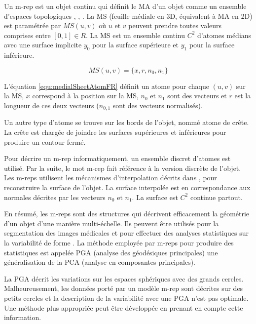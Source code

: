Un m-rep est un objet continu qui définit le MA d'un objet comme un ensemble d'espaces topologiques \cite{pizer1999segmentation}, \cite{yushkevich2003continuous}, \cite{pizer2003deformable}.
La MS (feuille médiale en 3D, équivalent à MA en 2D) est paramétrée par $MS (u, v)$ où $u$ et $v$ peuvent prendre toutes valeurs comprises entre $[0, 1] \in R$.
La MS est un ensemble continu $C^2$ d'atomes médians avec une surface implicite $y_{0}$ pour la surface supérieure et $y_{1}$ pour la surface inférieure.

\begin{equation}
MS (u, v) = \{x, r, n_0, n_1\}
\label{equ:medialSheetAtomFR}
\end{equation}

L'équation \ref{equ:medialSheetAtomFR} définit un atome pour chaque $(u, v)$ sur la MS,
$x$ correspond à la position sur la MS, $n_0$ et $n_1$ sont des vecteurs et $r$ est la longueur de ces deux vecteurs ($n_{0, 1}$ sont des vecteurs normalisés).


Un autre type d'atome se trouve sur les bords de l'objet, nommé atome de crête.
La crête est chargée de joindre les surfaces supérieures et inférieures pour produire un contour fermé.

Pour décrire un m-rep informatiquement, un ensemble discret d'atomes est utilisé.
Par la suite, le mot m-rep fait référence à la version discrète de l'objet.
Les m-reps utilisent les mécanismes d'interpolation décrits dans \cite{thall2004deformable}, pour reconstruire la surface de l'objet.
La surface interpolée est en correspondance aux normales décrites par les vecteurs $n_0$ et $n_1$.
La surface est $C^2$ continue partout.

En résumé, les m-reps sont des structures qui décrivent efficacement la géométrie d'un objet d'une manière multi-échelle.
Ils peuvent être utilisés pour la segmentation des images médicales \cite{pizer2005method} et pour effectuer des analyses statistiques sur la variabilité de forme \cite{fletcher2004principal}.
La méthode employée par m-reps pour produire des statistiques est appelée PGA (analyse des géodésiques principales) une généralisation de la PCA (analyse en composantes principales).

La PGA décrit les variations sur les espaces sphériques avec des grands cercles.
Malheureusement, les données porté par un modèle m-rep sont décrites sur des petits cercles et 
la description de la variabilité avec une PGA n'est pas optimale.
Une méthode plus appropriée peut être développée en prenant en compte cette information.

